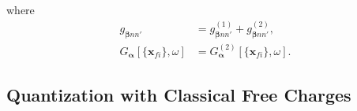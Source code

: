 \documentclass{article}
\begin{document}
where
\begin{equation}
\begin{split}
g_{\bm{\beta}nn'} &= g_{\bm{\beta}nn'}^{(1)} + g_{\bm{\beta}nn'}^{(2)},\\
G_{\bm{\alpha}}[\{\mathbf{x}_{fi}\},\omega] &= G_{\bm{\alpha}}^{(2)}[\{\mathbf{x}_{fi}\},\omega].
\end{split}
\end{equation}















\subsection{Quantization with Classical Free Charges}
\end{document}
